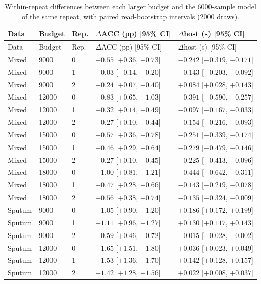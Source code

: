 \begin{longtable}{lllll}
\caption{Within-repeat differences between each larger budget and the 6000-sample model of the same repeat, with paired read-bootstrap intervals (2000 draws).}\label{tab:s_budget_paired}\\
\toprule
Data & Budget & Rep. & $\Delta$ACC (pp) [95\% CI] & $\Delta$host (s) [95\% CI]\\\midrule\endfirsthead
\toprule
Data & Budget & Rep. & $\Delta$ACC (pp) [95\% CI] & $\Delta$host (s) [95\% CI]\\\midrule\endhead
\bottomrule\endfoot
Mixed & 9000 & 0 & $+0.55$ [$+0.36$, $+0.73$] & $-0.242$ [$-0.319$, $-0.171$]\\
Mixed & 9000 & 1 & $+0.03$ [$-0.14$, $+0.20$] & $-0.143$ [$-0.203$, $-0.092$]\\
Mixed & 9000 & 2 & $+0.24$ [$+0.07$, $+0.40$] & $+0.084$ [$+0.028$, $+0.143$]\\
Mixed & 12000 & 0 & $+0.83$ [$+0.65$, $+1.03$] & $-0.391$ [$-0.590$, $-0.257$]\\
Mixed & 12000 & 1 & $+0.32$ [$+0.14$, $+0.49$] & $-0.097$ [$-0.167$, $-0.033$]\\
Mixed & 12000 & 2 & $+0.27$ [$+0.10$, $+0.44$] & $-0.154$ [$-0.216$, $-0.093$]\\
Mixed & 15000 & 0 & $+0.57$ [$+0.36$, $+0.78$] & $-0.251$ [$-0.339$, $-0.174$]\\
Mixed & 15000 & 1 & $+0.46$ [$+0.29$, $+0.64$] & $-0.279$ [$-0.479$, $-0.146$]\\
Mixed & 15000 & 2 & $+0.27$ [$+0.10$, $+0.45$] & $-0.225$ [$-0.413$, $-0.096$]\\
Mixed & 18000 & 0 & $+1.00$ [$+0.81$, $+1.21$] & $-0.444$ [$-0.642$, $-0.311$]\\
Mixed & 18000 & 1 & $+0.47$ [$+0.28$, $+0.66$] & $-0.143$ [$-0.219$, $-0.078$]\\
Mixed & 18000 & 2 & $+0.56$ [$+0.38$, $+0.74$] & $-0.135$ [$-0.324$, $-0.009$]\\
Sputum & 9000 & 0 & $+1.05$ [$+0.90$, $+1.20$] & $+0.186$ [$+0.172$, $+0.199$]\\
Sputum & 9000 & 1 & $+1.11$ [$+0.96$, $+1.27$] & $+0.130$ [$+0.117$, $+0.143$]\\
Sputum & 9000 & 2 & $+0.59$ [$+0.46$, $+0.72$] & $-0.015$ [$-0.028$, $-0.002$]\\
Sputum & 12000 & 0 & $+1.65$ [$+1.51$, $+1.80$] & $+0.036$ [$+0.023$, $+0.049$]\\
Sputum & 12000 & 1 & $+1.53$ [$+1.36$, $+1.70$] & $+0.142$ [$+0.128$, $+0.157$]\\
Sputum & 12000 & 2 & $+1.42$ [$+1.28$, $+1.56$] & $+0.022$ [$+0.008$, $+0.037$]\\
\end{longtable}
